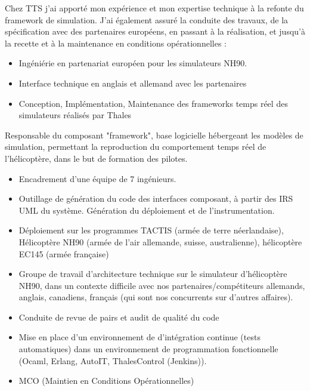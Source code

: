 \myvspace

Chez TTS j'ai apporté mon expérience et mon expertise technique à la refonte du framework de simulation. J'ai également assuré la conduite des travaux, de la spécification avec des partenaires européens, en passant à la réalisation, et jusqu'à la recette et à la maintenance en conditions opérationnelles :
\begin{itemize}
\item {Ingéniérie en partenariat européen pour les simulateurs NH90.}
\item {Interface technique en anglais et allemand avec les partenaires}
\item {Conception, Implémentation, Maintenance des frameworks temps réel des simulateurs réalisés par Thales}
\end{itemize}
\myvspace
Responsable du composant "framework", base logicielle hébergeant les modèles de simulation, permettant la reproduction du comportement temps réel de l'hélicoptère, dans le but de formation des pilotes.
\begin{itemize}
\item{	Encadrement d’une équipe de 7 ingénieurs.}
\item{	Outillage de génération du code des interfaces composant, à partir des IRS UML du système. Génération du déploiement et de l’instrumentation.}
\item{Déploiement sur les programmes TACTIS (armée de terre néerlandaise), Hélicoptère NH90 (armée de l’air allemande, suisse, australienne), hélicoptère EC145 (armée française)}
\item{Groupe de travail d’architecture technique sur le simulateur d’hélicoptère NH90, dans un contexte difficile avec nos partenaires/compétiteurs allemands, anglais, canadiens, français (qui sont nos concurrents sur d’autres affaires).}
\item {Conduite de revue de pairs et audit de qualité du code}
\item {Mise en place d’un environnement de d’intégration continue (tests automatiques) dans un environnement de programmation fonctionnelle (Ocaml, Erlang, AutoIT, ThalesControl (Jenkins)).}
\item {MCO (Maintien en Conditions Opérationnelles)}
\end{itemize}